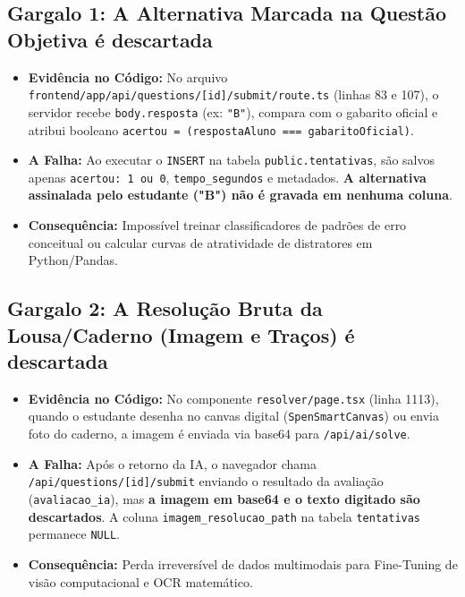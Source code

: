\documentclass[11pt,a4paper]{article}
\begin{document}
\subsection{Gargalo 1: A Alternativa Marcada na Questão Objetiva é descartada}
\begin{itemize}[leftmargin=*]
    \item \textbf{Evidência no Código:} No arquivo \texttt{frontend/app/api/questions/[id]/submit/route.ts} (linhas 83 e 107), o servidor recebe \texttt{body.resposta} (ex: \texttt{"B"}), compara com o gabarito oficial e atribui booleano \texttt{acertou = (respostaAluno === gabaritoOficial)}.
    \item \textbf{A Falha:} Ao executar o \texttt{INSERT} na tabela \texttt{public.tentativas}, são salvos apenas \texttt{acertou: 1 ou 0}, \texttt{tempo\_segundos} e metadados. \textbf{A alternativa assinalada pelo estudante ("B") não é gravada em nenhuma coluna}.
    \item \textbf{Consequência:} Impossível treinar classificadores de padrões de erro conceitual ou calcular curvas de atratividade de distratores em Python/Pandas.
\end{itemize}

\subsection{Gargalo 2: A Resolução Bruta da Lousa/Caderno (Imagem e Traços) é descartada}
\begin{itemize}[leftmargin=*]
    \item \textbf{Evidência no Código:} No componente \texttt{resolver/page.tsx} (linha 1113), quando o estudante desenha no canvas digital (\texttt{SpenSmartCanvas}) ou envia foto do caderno, a imagem é enviada via base64 para \texttt{/api/ai/solve}.
    \item \textbf{A Falha:} Após o retorno da IA, o navegador chama \texttt{/api/questions/[id]/submit} enviando o resultado da avaliação (\texttt{avaliacao\_ia}), mas \textbf{a imagem em base64 e o texto digitado são descartados}. A coluna \texttt{imagem\_resolucao\_path} na tabela \texttt{tentativas} permanece \texttt{NULL}.
    \item \textbf{Consequência:} Perda irreversível de dados multimodais para Fine-Tuning de visão computacional e OCR matemático.
\end{itemize}
\end{document}
